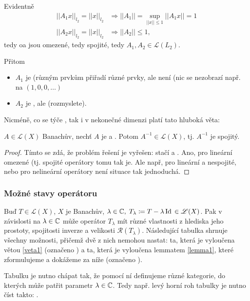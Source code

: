 Evidentně
\begin{equation*}
\begin{split}
  ||A_1x||_{l_2}=||x||_{l_2}&\Rightarrow ||A_1||=\sup\limits_{||x||\leq1}||A_1 x||=1\\
  ||A_2x||_{l_2}=||x||_{l_2}&\Rightarrow ||A_2||\leq1,
\end{split}
\end{equation*}
tedy oa jsou omezené, tedy spojité, tedy $A_1,A_2\in \mathscr{L}(L_2)$.

Přitom \begin{itemize}
    \item $A_1$ je  (různým prvkům přiřadí různé prvky, ale není  (nic se nezobrazí např. na $(1,0,0,\dots)$
    \item $A_2$ je , ale  (rozmyslete).
\end{itemize}

Nicméně, co se týče , tak i v nekonečné dimenzi platí tato hluboká věta:
\begin{theorem}
$A\in \mathscr{L}(X)$ Banachův, nechť $A$ je  a . Potom $A^{-1}\in \mathscr{L}(X)$, tj. $A^{-1}$ je spojitý.
\end{theorem}

\begin{proof}
    Tímto se zdá, že problém  řešení je vyřešen: stačí  a . Ano, pro lineární omezené (tj. spojité operátory tomu tak je. Ale např, pro lineární a nespojité, nebo pro nelineární operátory není situace tak jednoduchá.
\end{proof}

\subsubsection{Možné stavy operátoru}
Buď $T\in\mathscr{L}(X)$, $X$ je Banachův, $\lambda\in\mathbb{C},\; T_\lambda\coloneqq T-\lambda\operatorname{Id}\, \in\mathscr{L}(X)$. Pak v závislosti na $\lambda\in\mathbb{C}$ může operátor $T_\lambda$ mít různé vlastnosti z hlediska jeho prostoty, spojitosti inverze a velikosti $\mathcal{R}(T_\lambda)$. Následující tabulka shrnuje všechny možnosti, přičemž dvě z nich nemohou nastat: ta, která je vyloučena větou \ref{veta1} (označeno ) a ta, která je vyloučena lemmatem \ref{lemma1}, které zformulujeme a dokážeme za níže (označeno ).

Tabulku je nutno chápat tak, že pomocí ní definujeme různé kategorie, do kterých může patřit parametr $\lambda\in\mathbb{C}$. Tedy např. levý horní roh tabulky je nutno číst takto: .












\pagebreak